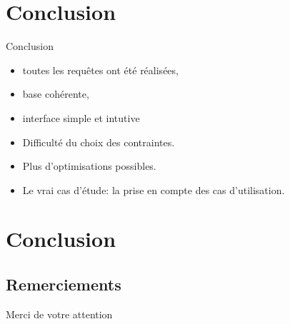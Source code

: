 \documentclass{beamer}
\begin{document}
\section*{Conclusion}
\begin{frame}

\begin{block}{Conclusion}
\begin{exampleblock}{}
\begin{center}
\begin{itemize}
\item{toutes les requêtes ont été réalisées,}
\item{base cohérente,}
\item{interface simple et intutive}
\end{itemize}
\end{center}
\end{exampleblock}



\begin{block}{}
\begin{center}
\begin{itemize}

\item Difficulté du choix des contraintes.
\item Plus d'optimisations possibles.
\item Le vrai cas d'étude: la prise en compte des cas d'utilisation.

\end{itemize}
\end{center}
\end{block}




\end{block}
\end{frame}


\section{Conclusion}
\subsection{Remerciements}
\begin{frame}
  \begin{center}
    \large{Merci de votre attention}
  \end{center}
  \end{frame}
\end{document}
